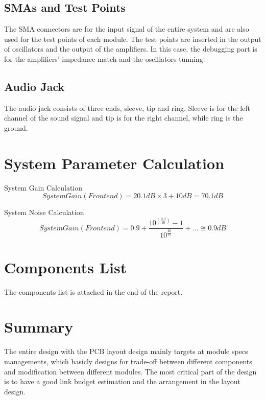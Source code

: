 \documentclass[]{article}
\begin{document}
    \subsection{SMAs and Test Points}
        The SMA connectors are for the input signal of the entire system and are
        also used for the test points of each module. The test points are
        inserted in the output of oscillators and the output of the amplifiers.
        In this case, the debugging part is for the amplifiers' impedance match
        and the oscillators tunning.
    \subsection{Audio Jack}
        The audio jack consists of three ends, sleeve, tip and ring. Sleeve is
        for the left channel of the sound signal and tip is for the right
        channel, while ring is the ground.

\section{System Parameter Calculation}
    System Gain Calculation
    \begin{equation}
        System Gain (Front end) = 20.1dB \times 3 + 10dB = 70.1dB
    \end{equation}

    System Noise Calculation
    \begin{equation}
        System Gain (Front end) = 0.9 +
        \frac{10^(\frac{0.9}{10})-1}{10^\frac{20}{10}} + ... \cong 0.9dB
    \end{equation}

\section{Components List}
    The components list is attached in the end of the report.

\section{Summary}
    The entire design with the PCB layout design mainly targets at module specs
    managements, which basicly designs for trade-off between different
    components and modification between different modules. The most critical
    part of the design is to have a good link budget estimation and the
    arrangement in the layout design. 
\end{document}
